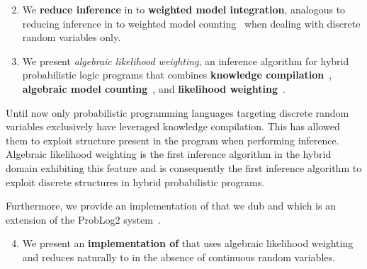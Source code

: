 \begin{enumerate}
\setcounter{enumi}{1}
	\item We {\bf reduce inference} in \dcproblogsty to {\bf weighted model integration}, analogous to reducing inference in \problogsty to weighted model counting~\citep{chavira2008probabilistic} when dealing with discrete random variables only.
	\item We present {\em algebraic likelihood weighting}, an inference algorithm for hybrid probabilistic logic programs that combines {\bf knowledge compilation}~\citep{darwiche2002knowledge}, {\bf algebraic model counting}~\citep{kimmig2017algebraic}, and {\bf likelihood weighting}~\citep{fung1989weighing}.
\end{enumerate}
Until now only probabilistic programming languages targeting discrete random variables exclusively have leveraged knowledge compilation. This has allowed them to exploit structure present in the program when performing inference.
Algebraic likelihood weighting is the first inference algorithm in the hybrid domain exhibiting this feature and is consequently the first inference algorithm to exploit discrete structures in hybrid probabilistic programs. 



Furthermore, we provide an implementation of \dcproblogsty that we dub \dcproblogsys and which is an extension of the ProbLog2 system~\citep{dries2015problog2}.
\begin{enumerate}
\setcounter{enumi}{3}
	\item We present an {\bf implementation of \dcproblogsty} that uses algebraic likelihood weighting and reduces naturally  to \problogsty in the absence of continuous random variables.
\end{enumerate}




